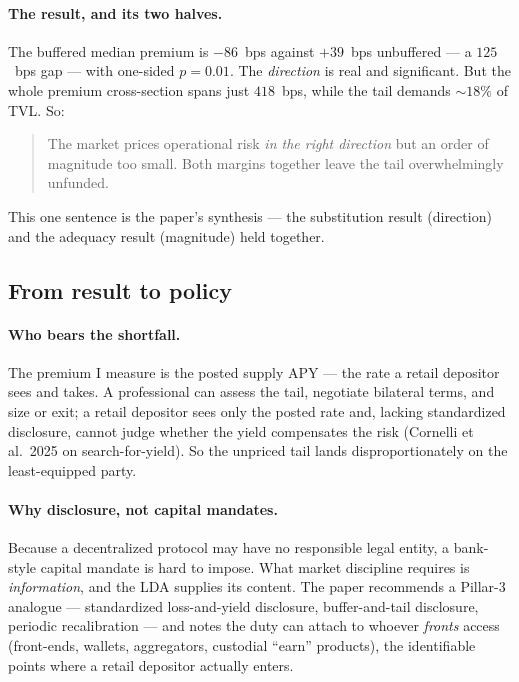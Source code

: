 \documentclass[11pt]{article}
\theoremstyle{definition}
\theoremstyle{remark}
\theoremstyle{definition}
\newcommand{\1}{\mathbf{1}}
\begin{document}
\paragraph{The result, and its two halves.}
The buffered median premium is $-86$~bps against $+39$~bps unbuffered --- a
$125$~bps gap --- with one-sided $p=0.01$. The \emph{direction} is real and
significant. But the whole premium cross-section spans just $418$~bps, while the
tail demands $\sim 18\%$ of TVL. So:
\begin{quote}
The market prices operational risk \emph{in the right direction} but an order
of magnitude too small. Both margins together leave the tail overwhelmingly
unfunded.
\end{quote}
This one sentence is the paper's synthesis --- the substitution result
(direction) and the adequacy result (magnitude) held together.

\subsection{From result to policy}

\paragraph{Who bears the shortfall.}
The premium I measure is the posted supply APY --- the rate a retail depositor
sees and takes. A professional can assess the tail, negotiate bilateral terms,
and size or exit; a retail depositor sees only the posted rate and, lacking
standardized disclosure, cannot judge whether the yield compensates the risk
(Cornelli et al.\ 2025 on search-for-yield). So the unpriced tail lands
disproportionately on the least-equipped party.

\paragraph{Why disclosure, not capital mandates.}
Because a decentralized protocol may have no responsible legal entity, a
bank-style capital mandate is hard to impose. What market discipline requires is
\emph{information}, and the LDA supplies its content. The paper recommends a
Pillar-3 analogue --- standardized loss-and-yield disclosure, buffer-and-tail
disclosure, periodic recalibration --- and notes the duty can attach to whoever
\emph{fronts} access (front-ends, wallets, aggregators, custodial ``earn''
products), the identifiable points where a retail depositor actually enters.
\end{document}
